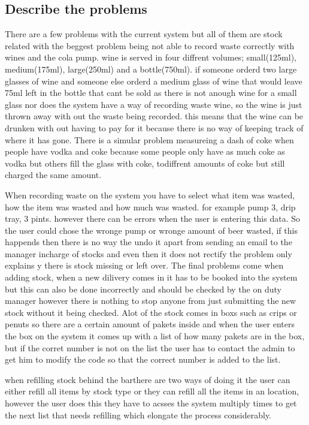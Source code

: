 \subsection{Describe the problems}

There are a few problems with the current system but all of them are stock related with the beggest problem being not able to record waste correctly with wines and the cola pump. wine is served in four diffrent volumes; small(125ml), medium(175ml), large(250ml) and a bottle(750ml). if someone orderd two large glasses of wine and someone else orderd a medium glass of wine that would leave 75ml left in the bottle that cant be sold as there is not anough wine for a small glass nor does the system have a way of recording waste wine, so the wine is just thrown away with out the waste being recorded. this means that the wine can be drunken with out having to pay for it because there is no way of keeping track of where it has gone. There is a simular problem measureing a dash of coke when people have vodka and coke because some people only have as much coke as vodka but others fill the glass with coke, todiffrent amounts of coke but still charged the same amount.

When recording waste on the system you have to select what item was wasted, how the item was wasted and how much was wasted. for example pump 3, drip tray, 3 pints. however there can be errors when the user is entering this data. So the user could chose the wronge pump or wronge amount of beer wasted, if this happends then there is no way the undo it apart from sending an email to the manager incharge of stocks and even then it does not rectify the problem only explains y there is stock missing or left over. The final problems come when adding stock, when a new dilivery comes in it has to be booked into the system but this can also be done incorrectly and should be checked by the on duty manager however there is nothing to stop anyone from just submitting the new stock without it being checked. Alot of the stock comes in boxs such as crips or penuts so there are a certain amount of pakets inside and when the user enters the box on the system it comes up with a list of how many pakets are in the box, but if the corret number is not on the list the user has to contact the admin to get him to modify the code so that the correct number is added to the list.

when refilling stock behind the barthere are two ways of doing it the user can either refill all items by stock type or they can refill all the items in an location, however the user does this they have to acsses the system multiply times to get the next list that needs refilling which elongate the process considerably.

